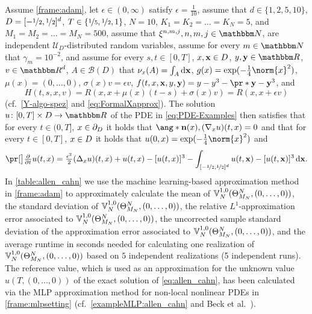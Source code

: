 Assume 
	\cref{frame:adam}, 
let
	$\epsilon\in(0,\infty)$
satisfy
	$\epsilon = \tfrac{1}{10}$,
assume that
	$d\in\{1,2,5,10\}$,
	$D = [-\nicefrac12,\nicefrac12]^d$,
	$T\in\{\nicefrac{1}{5},\nicefrac{1}{2},1\}$,
	$N=10$,
	$K_1 = K_2 = \ldots = K_N= 5$, and
	$M_1 = M_2 = \ldots = M_N = 500$,
assume that 
	$\xi^{n,m,j}, n, m, j \in \N$,
	are independent $\mathcal{U}_{D}$-distributed random variables,
assume 
	for every 
		$m \in \N$
	that
		$\gamma_m =10^{-2}$,
	and
assume 
	for every 
		$s,t \in [0,T]$, 
		$x,\mathbf{x}
		\in D$, 
		$y,\mathbf{y} \in \R$,
		$v\in\R^d$,
		$A \in \mathcal{B}(D)$
	that
		$\nu_x(A) = \int_A \mathrm{d}\mathbf{x}$,
		$g(x)= \exp (-\tfrac{1}{4}\norm{x}^2)$,
		$\mu(x)=(0, \dots, 0)$,
		$\sigma(x) v = \epsilon v$, 
		$f(t,x,\mathbf{x},y,\mathbf{y}
		)=  y - y^3 - \pr*{ \mathbf{y} - \mathbf{y}^3}$, and
	\begin{equation}
		\label{eq:Hallencahn}
		H(t,s,x,v) 
		=
		R(x,x+\mu(x)(t-s)+\sigma(x)v)
		=
		R(x,x+\epsilon v)
	\end{equation}
	(cf.\ \eqref{Y-algo-spez} and \eqref{eq:FormalXapprox}).
The solution 
	$u\colon[0,T]\times \D \to \R$ 
	of the PDE in \eqref{eq:PDE-Examples} then satisfies that 
		for every
		$t\in (0,T]$, 
		$x\in\partial_D$
	it holds that
		$\ang*{\mathbf{n}(x) ,(\nabla_x u)(t,x)} = 0$
	and that for every
			$t\in [0,T]$, 
			$x\in D$ 
		it holds that 
			$u(0,x)=\exp (-\tfrac{1}{4}\norm{x}^2)$ and
		\begin{equation}
			\bpr{\tfrac{\partial}{\partial t}u}(t,x)
			=
			\tfrac{\epsilon^2}{2} (\Delta_x u)(t,x) + u(t,x) - [u(t,x)]^3 - \int_{[-\nicefrac12,\nicefrac12]^d} u(t,\mathbf{x}) - [u(t,\mathbf{x})]^3 \,\diff\mathbf{x}
			.
		\label{eq:allen_cahn}
		\end{equation}
%
%
In \cref{table:allen_cahn}
we use the machine learning-based approximation method
in \cref{frame:adam}
to approximately calculate
the mean of %
$
{\mathbb{V}}^{1,0}_N(\Theta^N_{M_N},\allowbreak (0,\ldots,0))
$,
the standard deviation of %
$
{\mathbb{V}}^{1,0}_N(\Theta^N_{M_N},\allowbreak (0,\ldots,0))
$,
the relative $ L^1 $-approximation error associated to %
$
{\mathbb{V}}^{1,0}_N(\Theta^N_{M_N},\allowbreak (0,\ldots,\allowbreak 0))
$,
the uncorrected sample standard deviation of the approximation error associated to %
$
{\mathbb{V}}^{1,0}_N(\Theta^N_{M_N},\allowbreak (0,\ldots,0))
$,
and the average runtime in seconds needed for calculating one realization of $
{\mathbb{V}}^{1,0}_N(\Theta^N_{M_N},\allowbreak (0,\ldots,0))
$
%
based on $5$ independent realizations (5 independent runs).
%
The reference value, which is used as an approximation for the unknown value $u(T,(0,\ldots,0))$
of the exact solution of \eqref{eq:allen_cahn}, has been calculated via the MLP approximation method for non-local nonlinear PDEs in \cref{frame:mlpsetting} (cf.~\cref{exampleMLP:allen_cahn} and Beck et al.~\citep[Remark~3.3]{Beck2017a}).

